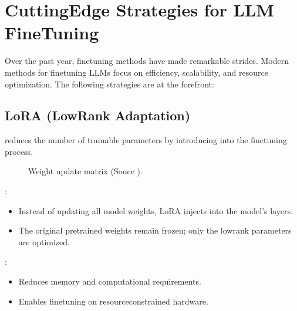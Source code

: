 \documentclass[letterpaper,11pt,english]{sphinxmanual}
\begin{document}
\section{Cutting\sphinxhyphen{}Edge Strategies for LLM Fine\sphinxhyphen{}Tuning}
\label{\detokenize{finetuning:cutting-edge-strategies-for-llm-fine-tuning}}
\sphinxAtStartPar
Over the past year, fine\sphinxhyphen{}tuning methods have made remarkable strides. Modern methods
for fine\sphinxhyphen{}tuning LLMs focus on efficiency, scalability, and resource optimization.
The following strategies are at the forefront:


\subsection{LoRA (Low\sphinxhyphen{}Rank Adaptation)}
\label{\detokenize{finetuning:lora-low-rank-adaptation}}
\sphinxAtStartPar
{} reduces the number of trainable parameters by introducing  into the fine\sphinxhyphen{}tuning process.

\begin{figure}[htbp]
\centering
\capstart

\noindent{}
\caption{Weight update matrix (Souce ).}\label{\detokenize{finetuning:id5}}\label{\detokenize{finetuning:fig-lora}}\end{figure}

\sphinxAtStartPar
{}:
\begin{itemize}
\item {} 
\sphinxAtStartPar
Instead of updating all model weights, LoRA injects  into the model’s layers.

\item {} 
\sphinxAtStartPar
The original pre\sphinxhyphen{}trained weights remain frozen; only the low\sphinxhyphen{}rank parameters are optimized.

\end{itemize}

\sphinxAtStartPar
{}:
\begin{itemize}
\item {} 
\sphinxAtStartPar
Reduces memory and computational requirements.

\item {} 
\sphinxAtStartPar
Enables fine\sphinxhyphen{}tuning on resource\sphinxhyphen{}constrained hardware.

\end{itemize}
\end{document}
